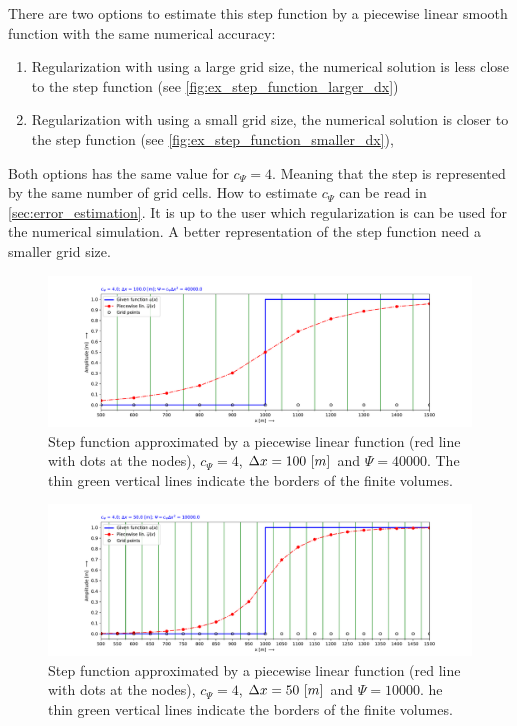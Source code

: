 There are two options to estimate this step function by a piecewise linear smooth function with the same numerical accuracy:
\begin{enumerate}
    \item Regularization with using a large grid size, the numerical solution is less close to the step function (see \autoref{fig:ex_step_function_larger_dx})
    \item Regularization with using a small grid size, the numerical solution is closer to the step function (see \autoref{fig:ex_step_function_smaller_dx}),
\end{enumerate}
Both options has the same value for $c_{\Psi} = 4$. Meaning that the step is represented by the same number of grid cells.
How to estimate $c_\Psi$ can be read in \autoref{sec:error_estimation}.
It is up to the user which regularization is can be used for the numerical simulation.
A better representation of the step function need a smaller grid size.
\begin{figure}[H]
    \centering
    \includegraphics[width=1.0\textwidth]{figures/regul_1d_step_function_dx100.0_cpsi4.0.pdf}
    \caption{Step function approximated by a piecewise linear function (red line with dots at the nodes), $c_{\Psi} = 4$, $\Delta x = 100\ [m]$ and $\Psi = 40000$. The thin green vertical lines indicate the  borders of the finite volumes. \label{fig:ex_step_function_larger_dx}}
\end{figure}
\begin{figure}[H]
    \centering
    \includegraphics[width=1.0\textwidth]{figures/regul_1d_step_function_dx50.0_cpsi4.0.pdf}
    \caption{Step function approximated by a piecewise linear function (red line with dots at the nodes), $c_{\Psi} = 4$, $\Delta x = 50\ [m]$ and $\Psi =10000$. he thin green vertical lines indicate the  borders of the finite volumes. \label{fig:ex_step_function_smaller_dx}}
\end{figure}
\vspace*{0.5\baselineskip}
%
